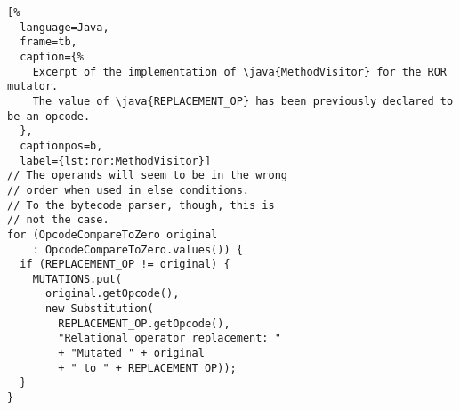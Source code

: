 \begin{lstlisting}[%
  language=Java,
  frame=tb,
  caption={%
    Excerpt of the implementation of \java{MethodVisitor} for the ROR mutator.
    The value of \java{REPLACEMENT_OP} has been previously declared to be an opcode.
  },
  captionpos=b,
  label={lst:ror:MethodVisitor}]
// The operands will seem to be in the wrong
// order when used in else conditions.
// To the bytecode parser, though, this is
// not the case.
for (OpcodeCompareToZero original
    : OpcodeCompareToZero.values()) {
  if (REPLACEMENT_OP != original) {
    MUTATIONS.put(
      original.getOpcode(),
      new Substitution(
        REPLACEMENT_OP.getOpcode(),
        "Relational operator replacement: "
        + "Mutated " + original
        + " to " + REPLACEMENT_OP));
  }
}
\end{lstlisting}
